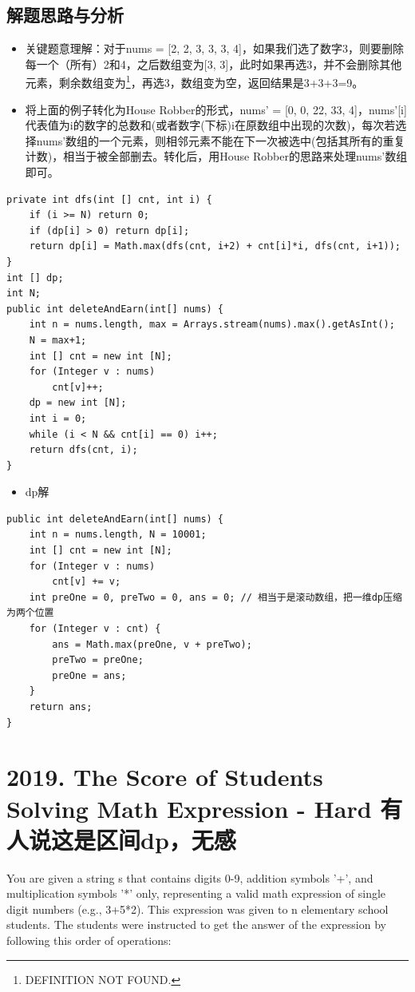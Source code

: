 \documentclass[9pt, b5paaper]{book}
\begin{document}
\subsection{解题思路与分析}
\label{sec-2-4-1}
\begin{itemize}
\item 关键题意理解：对于nums = [2, 2, 3, 3, 3, 4]，如果我们选了数字3，则要删除每一个（所有）2和4，之后数组变为[3, 3]，此时如果再选3，并不会删除其他元素，剩余数组变为\footnote{DEFINITION NOT FOUND.}，再选3，数组变为空，返回结果是3+3+3=9。
\item 将上面的例子转化为House Robber的形式，nums' = [0, 0, 22, 33, 4]，nums'[i]代表值为i的数字的总数和(或者数字(下标)i在原数组中出现的次数)，每次若选择nums'数组的一个元素，则相邻元素不能在下一次被选中(包括其所有的重复计数)，相当于被全部删去。转化后，用House Robber的思路来处理nums'数组即可。
\end{itemize}
\begin{verbatim}
private int dfs(int [] cnt, int i) {
    if (i >= N) return 0;
    if (dp[i] > 0) return dp[i];
    return dp[i] = Math.max(dfs(cnt, i+2) + cnt[i]*i, dfs(cnt, i+1));
}
int [] dp;
int N;
public int deleteAndEarn(int[] nums) {
    int n = nums.length, max = Arrays.stream(nums).max().getAsInt();
    N = max+1;
    int [] cnt = new int [N];
    for (Integer v : nums) 
        cnt[v]++;
    dp = new int [N];
    int i = 0;
    while (i < N && cnt[i] == 0) i++;
    return dfs(cnt, i);
}
\end{verbatim}
\begin{itemize}
\item dp解
\end{itemize}
\begin{verbatim}
public int deleteAndEarn(int[] nums) {
    int n = nums.length, N = 10001;
    int [] cnt = new int [N];
    for (Integer v : nums) 
        cnt[v] += v;
    int preOne = 0, preTwo = 0, ans = 0; // 相当于是滚动数组，把一维dp压缩为两个位置
    for (Integer v : cnt) {
        ans = Math.max(preOne, v + preTwo);
        preTwo = preOne;
        preOne = ans;
    }
    return ans;
}
\end{verbatim}


\section{2019. The Score of Students Solving Math Expression - Hard 有人说这是区间dp，无感}
\label{sec-2-5}
You are given a string s that contains digits 0-9, addition symbols '+', and multiplication symbols '*' only, representing a valid math expression of single digit numbers (e.g., 3+5*2). This expression was given to n elementary school students. The students were instructed to get the answer of the expression by following this order of operations:
\end{document}

